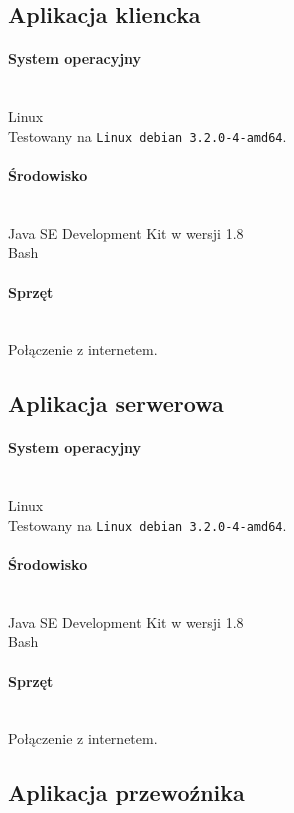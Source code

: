 \documentclass[pdftex,13pt,a4paper]{article}
\begin{document}
\subsection{Aplikacja kliencka}

\paragraph{System operacyjny}\mbox{}\\
	Linux\\
	Testowany na \texttt{Linux debian 3.2.0-4-amd64}.

\paragraph{Środowisko}\mbox{}\\
	Java SE Development Kit w wersji 1.8\\
	Bash

\paragraph{Sprzęt}\mbox{}\\
	Połączenie z internetem.

\subsection{Aplikacja serwerowa}

\paragraph{System operacyjny}\mbox{}\\
	Linux\\
	Testowany na \texttt{Linux debian 3.2.0-4-amd64}.

\paragraph{Środowisko}\mbox{}\\
	Java SE Development Kit w wersji 1.8\\
	Bash

\paragraph{Sprzęt}\mbox{}\\
	Połączenie z internetem.

\subsection{Aplikacja przewoźnika}
\end{document}
